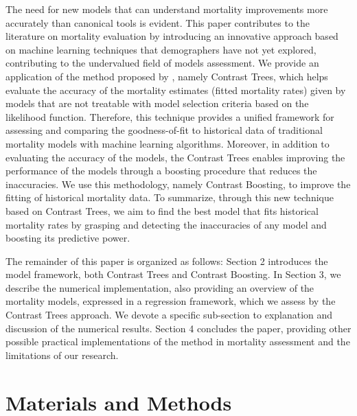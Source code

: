 \documentclass[fleqn,10pt]{wlscirep}
\begin{document}
The need for new models that can understand mortality improvements more accurately than canonical tools is evident. 
This paper contributes to the literature on mortality evaluation by introducing an innovative approach based on machine learning techniques that demographers have not yet explored, contributing to the undervalued field of models assessment. 
\color{blue}
We provide an application of the method proposed by \cite{Friedman2020}, namely Contrast Trees, which helps evaluate the accuracy of the mortality estimates (fitted mortality rates) given by models that are not treatable with model selection criteria based on the likelihood function. Therefore, this technique provides a unified framework for assessing and comparing the goodness-of-fit to historical data of traditional mortality models with machine learning algorithms.
\color{black}
Moreover, in addition to evaluating the accuracy of the models, the Contrast Trees enables improving the performance of the models through a boosting procedure that reduces the inaccuracies. We use this methodology, namely Contrast Boosting, to improve \color{blue}the fitting of historical mortality data.
To summarize, through this new technique based on Contrast Trees, we aim to find the best model that fits historical mortality rates by grasping and detecting the inaccuracies of any model and boosting its predictive power. \color{black}

The remainder of this paper is organized as follows: Section 2 introduces the model framework, both Contrast Trees and Contrast Boosting. 
In Section 3, we describe the numerical implementation, also providing an overview of the mortality models, expressed in a regression framework, which we assess by the Contrast Trees approach. We devote a specific sub-section to explanation and discussion of the numerical results. 
Section 4 concludes the paper, providing other possible practical implementations of the method in mortality assessment and the limitations of our research.

\section*{Materials and Methods}
\end{document}
